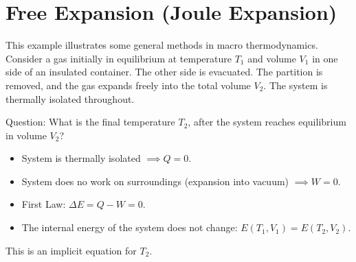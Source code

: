 \documentclass[11pt]{article}
\begin{document}
\section*{Free Expansion (Joule Expansion)}

This example illustrates some general methods in macro thermodynamics.
Consider a gas initially in equilibrium at temperature $T_1$ and volume $V_1$ in one side of an insulated container. The other side is evacuated. The partition is removed, and the gas expands freely into the total volume $V_2$. The system is thermally isolated throughout.

\begin{center}
\end{center}

Question: What is the final temperature $T_2$, after the system reaches equilibrium in volume $V_2$?
\begin{itemize}
    \item System is thermally isolated $\implies Q=0$.
    \item System does no work on surroundings (expansion into vacuum) $\implies W=0$.
    \item First Law: $\Delta E = Q - W = 0$.
    \item The internal energy of the system does not change: $E(T_1, V_1) = E(T_2, V_2)$.
\end{itemize}
This is an implicit equation for $T_2$.
\end{document}
